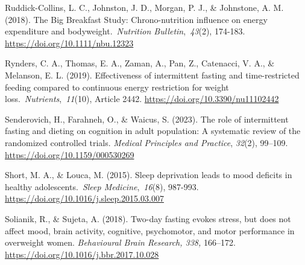 \documentclass[authordate, empirical]{jote-new-article}
\begin{document}
Ruddick-Collins, L. C., Johnston, J. D., Morgan, P. J., \& Johnstone, A. M. (2018). The Big Breakfast Study: Chrono-nutrition influence on energy expenditure and bodyweight. \emph{Nutrition Bulletin}, \emph{43}(2), 174-183. \url{https://doi.org/10.1111/nbu.12323}



Rynders, C. A., Thomas, E. A., Zaman, A., Pan, Z., Catenacci, V. A., \& Melanson, E. L. (2019). Effectiveness of intermittent fasting and time-restricted feeding compared to continuous energy restriction for weight loss. \emph{Nutrients}, \emph{11}(10), Article 2442. \url{https://doi.org/10.3390/nu11102442}






Senderovich, H., Farahneh, O., \& Waicus, S. (2023). The role of intermittent fasting and dieting on cognition in adult population: A systematic review of the randomized controlled trials. \emph{Medical Principles and Practice}, \emph{32}(2), 99--109. \href{https://doi.org/10.1159/000530269}{https://doi.org/10.1159/000530269}






Short, M. A., \& Louca, M. (2015). Sleep deprivation leads to mood deficits in healthy adolescents. \emph{Sleep Medicine}, \emph{16}(8), 987-993. \url{https://doi.org/10.1016/j.sleep.2015.03.007}



Solianik, R., \& Sujeta, A. (2018). Two-day fasting evokes stress, but does not affect mood, brain activity, cognitive, psychomotor, and motor performance in overweight women. \emph{Behavioural Brain Research, 338,} 166--172. \url{https://doi.org/10.1016/j.bbr.2017.10.028}



\end{document}
